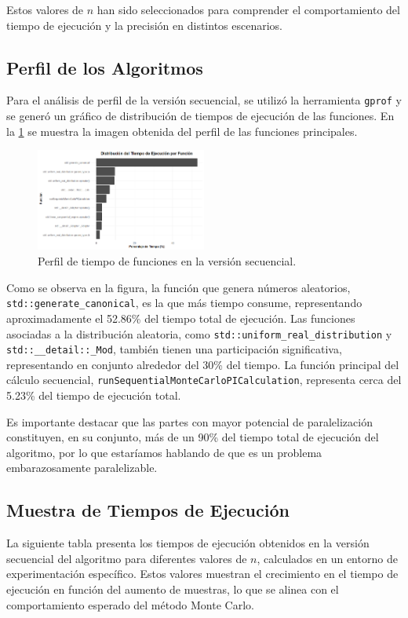\documentclass[a4paper, 10pt]{IEEEtran}
\begin{document}
Estos valores de $n$ han sido seleccionados para comprender el comportamiento del tiempo de ejecución y la precisión en distintos escenarios.

\subsection{Perfil de los Algoritmos}
Para el análisis de perfil de la versión secuencial, se utilizó la herramienta \texttt{gprof} y se generó un gráfico de distribución de tiempos de ejecución de las funciones. En la \cref{fig:sec_profile} se muestra la imagen obtenida del perfil de las funciones principales.

\begin{figure}[H]
  \centering
  \includegraphics[width=0.5\textwidth]{./img/secuencial.png}
  \caption{Perfil de tiempo de funciones en la versión secuencial.}
  \label{fig:sec_profile}
\end{figure}

Como se observa en la figura, la función que genera números aleatorios, \texttt{std::generate\_canonical}, es la que más tiempo consume, representando aproximadamente el 52.86\% del tiempo total de ejecución. Las funciones asociadas a la distribución aleatoria, como \texttt{std::uniform\_real\_distribution} y \texttt{std::\_\_detail::\_Mod}, también tienen una participación significativa, representando en conjunto alrededor del 30\% del tiempo. La función principal del cálculo secuencial, \texttt{runSequentialMonteCarloPICalculation}, representa cerca del 5.23\% del tiempo de ejecución total.

Es importante destacar que las partes con mayor potencial de paralelización constituyen, en su conjunto, más de un 90\% del tiempo total de ejecución del algoritmo, por lo que estaríamos hablando de que es un problema embarazosamente paralelizable.

\subsection{Muestra de Tiempos de Ejecución}
La siguiente tabla presenta los tiempos de ejecución obtenidos en la versión secuencial del algoritmo para diferentes valores de $n$, calculados en un entorno de experimentación específico. Estos valores muestran el crecimiento en el tiempo de ejecución en función del aumento de muestras, lo que se alinea con el comportamiento esperado del método Monte Carlo.
\end{document}
